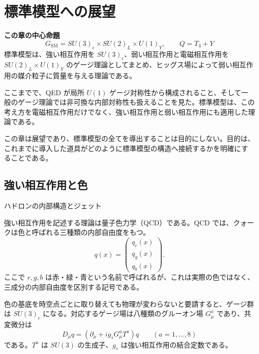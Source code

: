 \section{標準模型への展望}

\noindent\textbf{この章の中心命題}
\[
\boxed{
G_{\mathrm{SM}}
=
SU(3)_c\times SU(2)_L\times U(1)_Y,
\qquad
Q=T_3+Y
}
\]
標準模型は、強い相互作用を $SU(3)_c$、弱い相互作用と電磁相互作用を $SU(2)_L\times U(1)_Y$ のゲージ理論としてまとめ、ヒッグス場によって弱い相互作用の媒介粒子に質量を与える理論である。

ここまでで、QED が局所 $U(1)$ ゲージ対称性から構成されること、そして一般のゲージ理論では非可換な内部対称性も扱えることを見た。標準模型は、この考え方を電磁相互作用だけでなく、強い相互作用と弱い相互作用にも適用した理論である。

この章は展望であり、標準模型の全てを導出することは目的にしない。目的は、これまでに導入した道具がどのように標準模型の構造へ接続するかを明確にすることである。

\subsection{強い相互作用と色}
\begin{experimentalfact}{ハドロンの内部構造とジェット}
\end{experimentalfact}

強い相互作用を記述する理論は量子色力学（QCD）である。QCD では、クォークは色と呼ばれる三種類の内部自由度をもつ。
\[
q(x)=
\begin{pmatrix}
q_r(x)\\
q_g(x)\\
q_b(x)
\end{pmatrix}.
\]
ここで $r,g,b$ は赤・緑・青という名前で呼ばれるが、これは実際の色ではなく、三成分の内部自由度を区別する記号である。

色の基底を時空点ごとに取り替えても物理が変わらないと要請すると、ゲージ群は $SU(3)_c$ になる。対応するゲージ場は八種類のグルーオン場 $G_\mu^a$ であり、共変微分は
\[
D_\mu q
=
\left(\partial_\mu+ig_sG_\mu^aT^a\right)q
\qquad(a=1,\dots,8)
\]
である。$T^a$ は $SU(3)$ の生成子、$g_s$ は強い相互作用の結合定数である。

